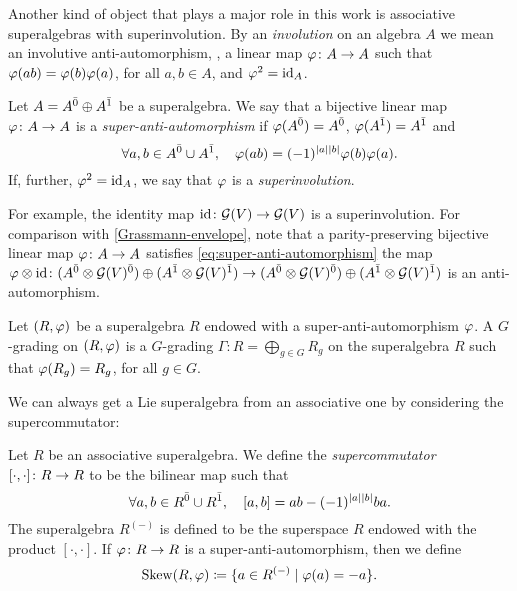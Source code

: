 Another kind of object that plays a major role in this work is associative superalgebras with superinvolution. 
By an \emph{involution} on an algebra $A$ we mean an involutive anti-automorphism, \ie, a linear map $\varphi\colon A \to A$ such that $\varphi(ab) = \varphi(b) \varphi(a)$, for all $a,b \in A$, and $\varphi^2 = \operatorname{id}_A$.

\begin{defi}\label{def:super-anti-automorphism}
    Let $A = A^{\bar0} \oplus A^{\bar1}$ be a superalgebra. 
    We say that a bijective linear map $\varphi\colon A \to A$ is a \emph{super-anti-automorphism} if $\varphi(A^{\bar0}) = A^{\bar0}$, $\varphi(A^{\bar1}) = A^{\bar1}$ and
    \[\label{eq:super-anti-automorphism}
        \forall a,b \in A^{\bar0} \cup A^{\bar1}, \quad \varphi(ab) = (-1)^{|a||b|} \varphi(b)\varphi(a).
    \]
    If, further, $\varphi^2 = \operatorname{id}_A$, we say that $\varphi$ is a \emph{superinvolution}. 
\end{defi}

For example, the identity map $\operatorname{id}\colon \mathcal G(V) \to \mathcal G(V)$ is a superinvolution. 
For comparison with \cref{Grassmann-envelope}, note that a parity-preserving bijective linear map $\varphi\colon A \to A$ satisfies \cref{eq:super-anti-automorphism} \IFF the map $\varphi \otimes \operatorname{id} \colon (A^{\bar0}\otimes \mathcal G(V)^{\bar0}) \oplus (A^{\bar1}\otimes \mathcal G(V)^{\bar1}) \to (A^{\bar0}\otimes \mathcal G(V)^{\bar0}) \oplus (A^{\bar1}\otimes \mathcal G(V)^{\bar1})$ is an anti-automorphism. 

\begin{defi}\label{defi:grd-superinv}
    Let $(R, \varphi)$ be a superalgebra $R$ endowed with a super\--anti\--auto\-mor\-phism $\varphi$. 
    A $G$-grading on $(R, \varphi)$ is a $G$-grading $\Gamma : R = \bigoplus_{g \in G} R_g$ on the superalgebra $R$ such that $\varphi(R_g) = R_g$, for all $g\in G$. 
\end{defi}

We can always get a Lie superalgebra from an associative one by considering the supercommutator:

\begin{defi}\label{defi:supercommutator}
    Let $R$ be an associative superalgebra. 
    We define the \emph{supercommutator} $[\cdot, \cdot]\colon R \to R$ to be the bilinear map such that
    \[
        \forall a,b\in R^{\bar0} \cup R^{\bar1}, \quad [a,b] = ab - (-1)^{|a||b|} ba.
    \]
    The superalgebra $R^{(-)}$ is defined to be the superspace $R$ endowed with the product $[\cdot, \cdot]$. 
    If $\varphi\colon R\to R$ is a super-anti-automorphism, then we define
    \[
        \operatorname{Skew}(R, \varphi) \coloneqq \{a \in R^{(-)} \mid \varphi(a) = -a \}.
    \]
\end{defi}

